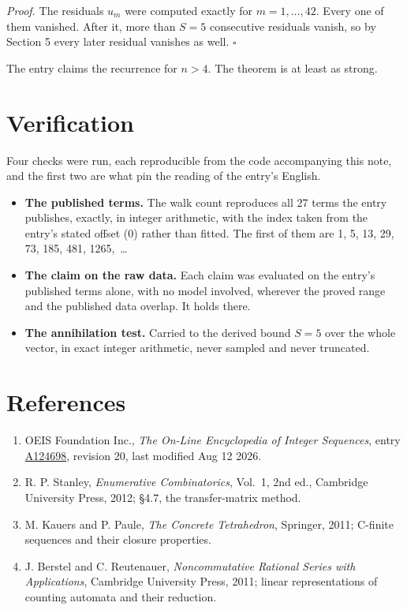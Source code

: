 \documentclass[11pt]{article}
\theoremstyle{definition}
\begin{document}
{\itshape Proof.} The residuals $u_m$ were computed exactly for $m = 1,\dots,42$. Every one of them vanished. After it, more than $S = 5$ consecutive residuals vanish, so by Section 5 every later residual vanishes as well. $\square$

The entry claims the recurrence for $n > 4$. The theorem is at least as strong.

\section{Verification}

Four checks were run, each reproducible from the code accompanying this note, and the first two are what pin the reading of the entry's English.

\begin{itemize}

\item {\bfseries The published terms.} The walk count reproduces all 27 terms the entry publishes, exactly, in integer arithmetic, with the index taken from the entry's stated offset (0) rather than fitted. The first of them are 1, 5, 13, 29, 73, 185, 481, 1265,~\dots

\item {\bfseries The claim on the raw data.} Each claim was evaluated on the entry's published terms alone, with no model involved, wherever the proved range and the published data overlap. It holds there.

\item {\bfseries The annihilation test.} Carried to the derived bound $S = 5$ over the whole vector, in exact integer arithmetic, never sampled and never truncated.

\end{itemize}

\section{References}

\begin{enumerate}

\item OEIS Foundation Inc., \emph{The On-Line Encyclopedia of Integer Sequences}, entry \href{https://oeis.org/A124698}{A124698}, revision 20, last modified Aug 12 2026.

\item R. P. Stanley, \emph{Enumerative Combinatorics}, Vol.~1, 2nd ed., Cambridge University Press, 2012; \S4.7, the transfer-matrix method.

\item M. Kauers and P. Paule, \emph{The Concrete Tetrahedron}, Springer, 2011; C-finite sequences and their closure properties.

\item J. Berstel and C. Reutenauer, \emph{Noncommutative Rational Series with Applications}, Cambridge University Press, 2011; linear representations of counting automata and their reduction.

\end{enumerate}
\end{document}
